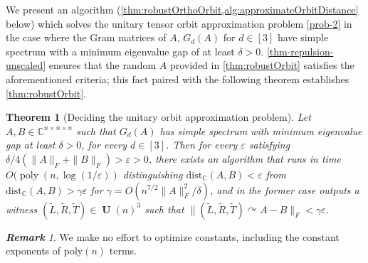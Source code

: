 \documentclass[11pt]{article}
\numberwithin{equation}{section}
\newtheorem{theorem}{Theorem}[section]
\theoremstyle{remark}
\newtheorem{remark}{\bf Remark}[section]
\DeclareMathOperator{\poly}{poly}
\DeclareMathOperator{\Unitary}{\textbf{U}}
\newcommand{\C}{\mathbb{C}}
\newcommand{\dist}{\mathrm{dist}}
\begin{document}
We present an algorithm (\cref{thm:robustOrthoOrbit,alg:approximateOrbitDistance} below) which solves the unitary tensor orbit approximation problem \cref{prob-2} in the case where the Gram matrices of $A$, $G_d(A)$ for $d\in [3]$ have simple spectrum with a minimum eigenvalue gap of at least $\delta>0$.
\cref{thm-repulsion-unscaled} ensures that the random $A$ provided in \cref{thm:robustOrbit} 
satisfies the aforementioned criteria; this fact paired with the following theorem establishes \cref{thm:robustOrbit}.

\begin{theorem}[Deciding the unitary orbit approximation problem]\label{thm:robustOrthoOrbit}
Let $A,B\in\C^{n\times n\times n}$ such that $G_d(A)$ has simple spectrum with minimum
eigenvalue gap at least $\delta > 0$, for every $d\in [3]$. Then for every $\varepsilon$ satisfying $\delta/4(\|A\|_F+\|B\|_F)> \varepsilon > 0$, there exists an algorithm that runs in time $O(\poly(n, \log(1/\varepsilon))$
distinguishing $\dist_\C(A,B)<\varepsilon$ from $\dist_\C(A,B)>\gamma\varepsilon$  
for $\gamma = O(n^{7/2}\|A\|^2_F/\delta)$, and in the former case outputs a witness $(\widetilde{L},\widetilde{R},\widetilde{T})\in \Unitary(n)^3$ such that 
$\|(\widetilde{L},\widetilde{R},\widetilde{T})\curvearrowright A-B\|_F< \gamma\varepsilon$.
\end{theorem}
\begin{remark}
We make no effort to optimize constants, including the constant exponents of poly$(n)$ terms. 
\end{remark}
\end{document}
